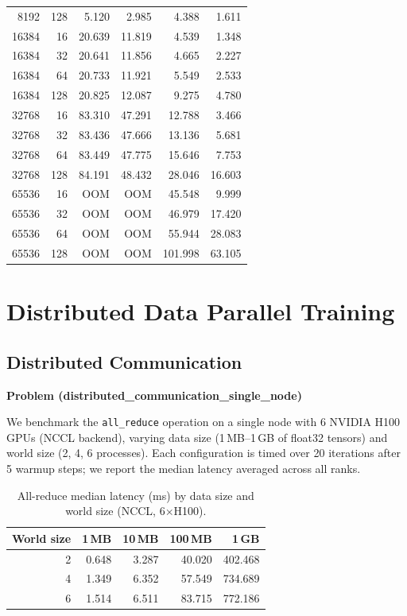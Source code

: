 \documentclass[11pt]{article}
\begin{document}
\begin{table}[H]
\begin{tabular}{rrrrrr}
8192 & 128 & 5.120 & 2.985 & 4.388 & 1.611 \\
16384 & 16 & 20.639 & 11.819 & 4.539 & 1.348 \\
16384 & 32 & 20.641 & 11.856 & 4.665 & 2.227 \\
16384 & 64 & 20.733 & 11.921 & 5.549 & 2.533 \\
16384 & 128 & 20.825 & 12.087 & 9.275 & 4.780 \\
32768 & 16 & 83.310 & 47.291 & 12.788 & 3.466 \\
32768 & 32 & 83.436 & 47.666 & 13.136 & 5.681 \\
32768 & 64 & 83.449 & 47.775 & 15.646 & 7.753 \\
32768 & 128 & 84.191 & 48.432 & 28.046 & 16.603 \\
65536 & 16 & OOM & OOM & 45.548 & 9.999 \\
65536 & 32 & OOM & OOM & 46.979 & 17.420 \\
65536 & 64 & OOM & OOM & 55.944 & 28.083 \\
65536 & 128 & OOM & OOM & 101.998 & 63.105 \\
\bottomrule
\end{tabular}
\end{table}


\section{Distributed Data Parallel Training}

\subsection{Distributed Communication}
\textbf{Problem (distributed\_communication\_single\_node)}

We benchmark the \texttt{all\_reduce} operation on a single node with 6
NVIDIA H100 GPUs (NCCL backend), varying data size
(1\,MB--1\,GB of float32 tensors) and world size (2, 4, 6 processes).
Each configuration is timed over 20 iterations after 5 warmup steps;
we report the median latency averaged across all ranks.

\begin{table}[H]\small\centering
\caption{All-reduce median latency (ms) by data size and world size (NCCL, 6$\times$H100).}
\label{tab:all-reduce}
\begin{tabular}{r rrrr}
\toprule
World size & 1\,MB & 10\,MB & 100\,MB & 1\,GB \\
\midrule
2 & 0.648 & 3.287 & 40.020 & 402.468 \\
4 & 1.349 & 6.352 & 57.549 & 734.689 \\
6 & 1.514 & 6.511 & 83.715 & 772.186 \\
\bottomrule
\end{tabular}
\end{table}
\end{document}
